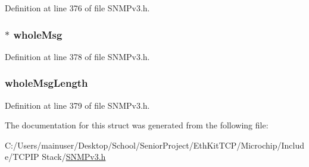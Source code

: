 Definition at line 376 of file S\+N\+M\+Pv3.\+h.

\hypertarget{struct_msg_proc_mod_prepare_data_elements_a004e34c44705bf128556c60cca7a6586}{}
\subsubsection[{whole\+Msg}]{$\ast$ whole\+Msg}\label{struct_msg_proc_mod_prepare_data_elements_a004e34c44705bf128556c60cca7a6586}


Definition at line 378 of file S\+N\+M\+Pv3.\+h.

\hypertarget{struct_msg_proc_mod_prepare_data_elements_ae69530a979f1b7b71b437d128ffc63ff}{}
\subsubsection[{whole\+Msg\+Length}]{ whole\+Msg\+Length}\label{struct_msg_proc_mod_prepare_data_elements_ae69530a979f1b7b71b437d128ffc63ff}


Definition at line 379 of file S\+N\+M\+Pv3.\+h.



The documentation for this struct was generated from the following file\+:\begin{DoxyCompactItemize}
\item 
C\+:/\+Users/mainuser/\+Desktop/\+School/\+Senior\+Project/\+Eth\+Kit\+T\+C\+P/\+Microchip/\+Include/\+T\+C\+P\+I\+P Stack/\hyperlink{_s_n_m_pv3_8h}{S\+N\+M\+Pv3.\+h}\end{DoxyCompactItemize}
